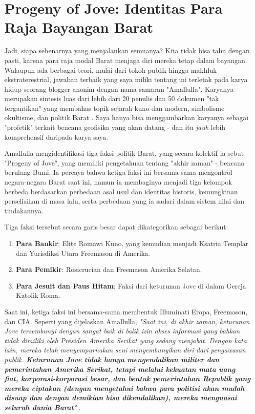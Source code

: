 \documentclass[10pt,twocolumn,letterpaper]{article}
\begin{document}
\section{Progeny of Jove: Identitas Para Raja Bayangan Barat}

Jadi, siapa sebenarnya yang menjalankan semuanya? Kita tidak bisa tahu dengan pasti, karena para raja modal Barat menjaga diri mereka tetap dalam bayangan. Walaupun ada berbagai teori, mulai dari tokoh publik hingga makhluk ekstraterestrial, jawaban terbaik yang saya miliki tentang ini terletak pada karya hidup seorang blogger anonim dengan nama samaran "Amallulla". Karyanya merupakan sintesis luas dari lebih dari 20 penulis dan 50 dokumen "tak tergantikan" yang membahas topik sejarah kuno dan modern, simbolisme okultisme, dan politik Barat \cite{33,34}. Saya hanya bisa menggambarkan karyanya sebagai "profetik" terkait bencana geofisika yang akan datang - dan itu \textit{jauh} lebih komprehensif daripada karya saya.

Amallulla mengidentifikasi tiga faksi politik Barat, yang secara kolektif ia sebut "Progeny of Jove", yang memiliki pengetahuan tentang "akhir zaman" - bencana berulang Bumi. Ia percaya bahwa ketiga faksi ini bersama-sama mengontrol negara-negara Barat saat ini, namun ia membaginya menjadi tiga kelompok berbeda berdasarkan perbedaan asal usul dan identitas historis, kemungkinan perselisihan di masa lalu, serta perbedaan yang ia sadari dalam sistem nilai dan tindakannya.

Tiga faksi tersebut secara garis besar dapat dikategorikan sebagai berikut:

\begin{flushleft}
\begin{enumerate}
    \item \textbf{Para Bankir}: Elite Romawi Kuno, yang kemudian menjadi Ksatria Templar dan Yurisdiksi Utara Freemason di Amerika.
    \item \textbf{Para Pemikir}: Rosicrucian dan Freemason Amerika Selatan.
    \item \textbf{Para Jesuit dan Paus Hitam}: Faksi dari keturunan Jove di dalam Gereja Katolik Roma.
\end{enumerate}
\end{flushleft}

Saat ini, ketiga faksi ini bersama-sama membentuk Illuminati Eropa, Freemason, dan CIA. Seperti yang dijelaskan Amallulla, \textit{"Saat ini, di akhir zaman, keturunan Jove tersembunyi dengan sangat baik di balik izin akses informasi yang bahkan tidak dimiliki oleh Presiden Amerika Serikat yang sedang menjabat. Dengan kata lain, mereka telah menyempurnakan seni menyembunyikan diri dari pengawasan publik. \textbf{Keturunan Jove tidak hanya mengendalikan militer dan pemerintahan Amerika Serikat, tetapi melalui kekuatan mata uang fiat, korporasi-korporasi besar, dan bentuk pemerintahan Republik yang mereka ciptakan (dengan mengetahui bahwa para politisi akan mudah disuap dan dengan demikian bisa dikendalikan), mereka menguasai seluruh dunia Barat}"} \cite{33,34}.
\end{document}
